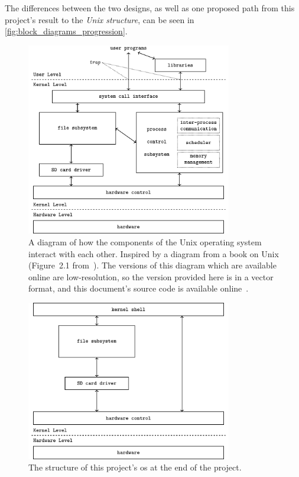 \documentclass{article}
\begin{document}
The differences between the two designs, as well as one proposed path from this
project's result to the \emph{Unix structure}, can be seen in
\autoref{fig:block_diagrams_progression}.

\begin{figure}[htbp]
    \centering
    \includegraphics[width=0.8\textwidth]{build/os-block-diagram.pdf}
    \caption{A diagram of how the components of the Unix operating system
        interact with each other. Inspired by a diagram from a book on Unix
        (Figure~2.1 from~\cite{design-of-unix-os}). The versions of this
        diagram which are available online are low-resolution, so the version
        provided here is in a vector format, and this document's source code is
        available online~\cite{this-document}.}
    \label{fig:os-block-diagram}
\end{figure}

\begin{figure}[htbp]
    \centering
    \includegraphics[width=0.8\textwidth]{build/finished-block-diagram.pdf}
    \caption{The structure of this project's \gls{os} at the end of the
    project.}
    \label{fig:finished_block_diagram}
\end{figure}
\end{document}

